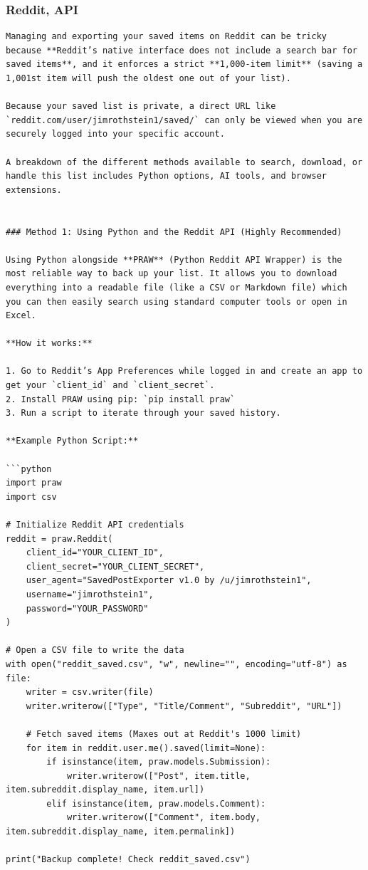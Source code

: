 \documentclass[
  letterpaper,
  DIV=11,
  numbers=noendperiod]{scrartcl}
\begin{document}
\subsubsection{Reddit, API}\label{reddit-api}

\begin{verbatim}
Managing and exporting your saved items on Reddit can be tricky because **Reddit’s native interface does not include a search bar for saved items**, and it enforces a strict **1,000-item limit** (saving a 1,001st item will push the oldest one out of your list).

Because your saved list is private, a direct URL like `reddit.com/user/jimrothstein1/saved/` can only be viewed when you are securely logged into your specific account.

A breakdown of the different methods available to search, download, or handle this list includes Python options, AI tools, and browser extensions.


### Method 1: Using Python and the Reddit API (Highly Recommended)

Using Python alongside **PRAW** (Python Reddit API Wrapper) is the most reliable way to back up your list. It allows you to download everything into a readable file (like a CSV or Markdown file) which you can then easily search using standard computer tools or open in Excel.

**How it works:**

1. Go to Reddit’s App Preferences while logged in and create an app to get your `client_id` and `client_secret`.
2. Install PRAW using pip: `pip install praw`
3. Run a script to iterate through your saved history.

**Example Python Script:**

```python
import praw
import csv

# Initialize Reddit API credentials
reddit = praw.Reddit(
    client_id="YOUR_CLIENT_ID",
    client_secret="YOUR_CLIENT_SECRET",
    user_agent="SavedPostExporter v1.0 by /u/jimrothstein1",
    username="jimrothstein1",
    password="YOUR_PASSWORD"
)

# Open a CSV file to write the data
with open("reddit_saved.csv", "w", newline="", encoding="utf-8") as file:
    writer = csv.writer(file)
    writer.writerow(["Type", "Title/Comment", "Subreddit", "URL"])

    # Fetch saved items (Maxes out at Reddit's 1000 limit)
    for item in reddit.user.me().saved(limit=None):
        if isinstance(item, praw.models.Submission):
            writer.writerow(["Post", item.title, item.subreddit.display_name, item.url])
        elif isinstance(item, praw.models.Comment):
            writer.writerow(["Comment", item.body, item.subreddit.display_name, item.permalink])

print("Backup complete! Check reddit_saved.csv")
\end{verbatim}
\end{document}

